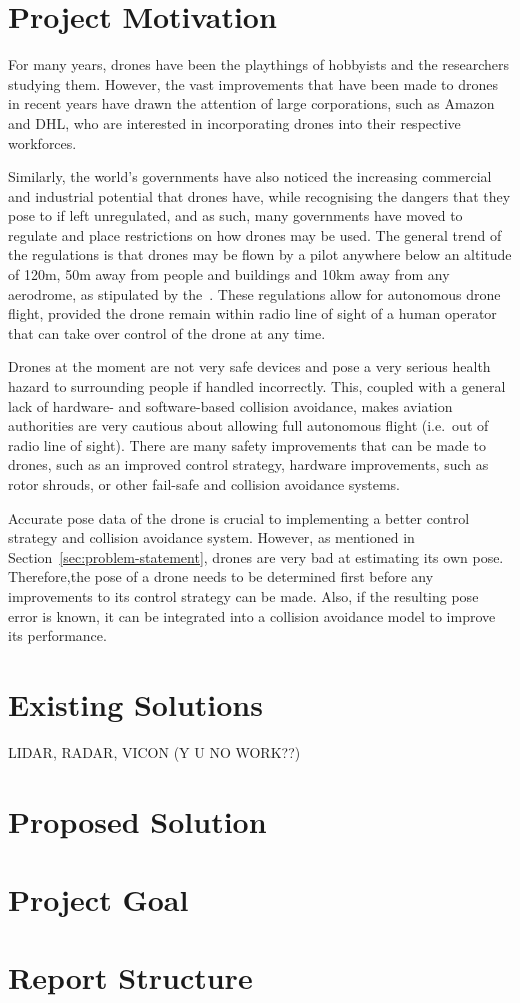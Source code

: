 \section{Project Motivation}

For many years, drones have been the playthings of hobbyists and the researchers studying them. However, the vast improvements that have been made to drones in recent years have drawn the attention of large corporations, such as Amazon and DHL, who are interested in incorporating drones into their respective workforces. 

Similarly, the world's governments have also noticed the increasing commercial and industrial potential that drones have, while recognising the dangers that they pose to if left unregulated, and as such, many governments have moved to regulate and place restrictions on how drones may be used. The general trend of the regulations is that drones may be flown by a pilot anywhere below an altitude of 120m, 50m away from people and buildings and 10km away from any aerodrome, as stipulated by the~\cite{sacaa-drone-regs}. These regulations allow for autonomous drone flight, provided the drone remain within radio line of sight of a human operator that can take over control of the drone at any time. 

Drones at the moment are not very safe devices and pose a very serious health hazard to surrounding people if handled incorrectly. This, coupled with a general lack of hardware- and software-based collision avoidance, makes aviation authorities are very cautious about allowing full autonomous flight (i.e.\ out of radio line of sight). There are many safety improvements that can be made to drones, such as an improved control strategy, hardware improvements, such as rotor shrouds, or other fail-safe and collision avoidance systems. 

Accurate pose data of the drone is crucial to implementing a better control strategy and collision avoidance system. However, as mentioned in Section~\ref{sec:problem-statement}, drones are very bad at estimating its own pose. Therefore,the pose of a drone needs to be determined first before any improvements to its control strategy can be made. Also, if the resulting pose error is known, it can be integrated into a collision avoidance model to improve its performance. 

\section{Existing Solutions}

LIDAR, RADAR, VICON (Y U NO WORK??)



\section{Proposed Solution}

\section{Project Goal}

\section{Report Structure}
